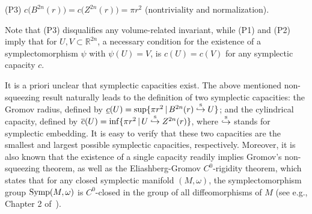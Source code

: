 \documentclass{icmart}
\theoremstyle{definition}
\begin{document}
\smallskip


\noindent (P3) $c \big (B^{2n}(r) \big ) = c \big (Z^{2n}(r) 
 \big ) = \pi r^2$ (nontriviality and
normalization).

\smallskip

Note that (P3)  disqualifies any volume-related
invariant, while (P1) and (P2) imply that for $U, V \subset {\mathbb
R}^{2n}$, a necessary condition for the existence of a
symplectomorphism $\psi $ %
 with $\psi(U) = V$, is $c(U) =c(V)$ for any symplectic capacity $c$.

%

\smallskip

It is a priori unclear that symplectic capacities exist.
The above mentioned non-squeezing result  naturally leads to the definition of two symplectic capacities: 
the Gromov radius, defined by $\underline c(U)=\sup\{\pi r^2 \, | \, B^{2n}(r) \stackrel{\rm s} \hookrightarrow U \} $; and the 
cylindrical capacity, defined by $\overline c(U) = \inf\{\pi r^2  \, | \, U \stackrel{\rm s} \hookrightarrow Z^{2n}(r) \} $, where $\stackrel{\rm s} \hookrightarrow$ stands for symplectic embedding. 
It is easy to verify that these two capacities are the smallest and largest  possible symplectic capacities, respectively. 
Moreover, it is also known that the existence of a single capacity readily implies Gromov's non-squeezing theorem, as well as 
the Eliashberg-Gromov $C^0$-rigidity theorem, which states that for any closed symplectic manifold $(M,\omega)$,  the  symplectomorphism group ${\rm Symp}(M,\omega)$  is $C^0$-closed in the group  of all  diffeomorphisms of $M$  (see e.g.,  Chapter 2 of~\cite{HZ}). 

\smallskip
\end{document}
